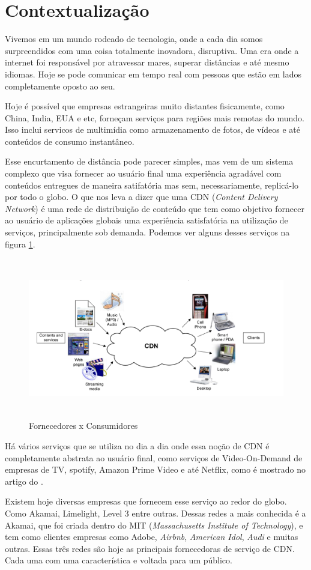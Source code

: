 \section{Contextualização}
Vivemos em um mundo rodeado de tecnologia, onde a cada dia somos surpreendidos com uma coisa totalmente inovadora, disruptiva. Uma era onde a internet foi respons\'avel por atravessar mares, superar dist\^ancias e at\'e mesmo idiomas. Hoje se pode comunicar em tempo real com pessoas que est\~ao em lados completamente oposto ao seu. 

Hoje \'e poss\'ivel que empresas estrangeiras muito distantes fisicamente, como China, India, EUA e etc, forne\c{c}am servi\c{c}os para regi\~oes mais remotas do mundo. Isso inclui servi{c}os de multim\'idia como armazenamento de fotos, de v\'ideos e at\'e conte\'udos de consumo instant\^aneo.

Esse encurtamento de dist\^ancia pode parecer simples, mas vem de um sistema complexo que visa fornecer ao usu\'ario final uma experi\^encia agrad\'avel com conte\'udos entregues de maneira satifat\'oria mas sem, necessariamente, replic\'a-lo por todo o globo. O que nos leva a dizer que uma CDN (\textit{Content Delivery Network}) \'e uma rede de distribui\c{c}\~ao de conte\'udo que tem como objetivo fornecer ao usu\'ario de aplica\c{c}\~oes globais uma experi\^encia satisfat\'oria na utiliza\c{c}\~ao de servi\c{c}os, principalmente sob demanda. Podemos ver alguns desses servi\c{c}os na figura \ref{figura:contextualizacao}.
\begin{figure}[H]
\includegraphics[height=7cm]{Figuras/contextualizacao.png}
\caption{Fornecedores x Consumidores} 
\label{figura:contextualizacao} 
\end{figure}
H\'a v\'arios servi\c{c}os que se utiliza no dia a dia onde essa no\c{c}\~ao de CDN \'e completamente abstrata ao usu\'ario final, como servi\c{c}os de Video-On-Demand de empresas de TV, spotify, Amazon Prime Video e at\'e Netflix, como \'e mostrado no artigo do \cite{adhikari2012unreeling}.

Existem hoje diversas empresas que fornecem esse servi\c{c}o ao redor do globo. Como Akamai, Limelight, Level 3 entre outras. Dessas redes a mais conhecida \'e a Akamai, que foi criada dentro do MIT (\textit{Massachusetts Institute of Technology}), e tem como clientes empresas como Adobe, \emph{Airbnb}, \emph{American Idol}, \emph{Audi} e muitas outras. Essas tr\^es redes s\~ao hoje as principais fornecedoras de servi\c{c}o de CDN. Cada uma com uma caracter\'istica e voltada para um p\'ublico.